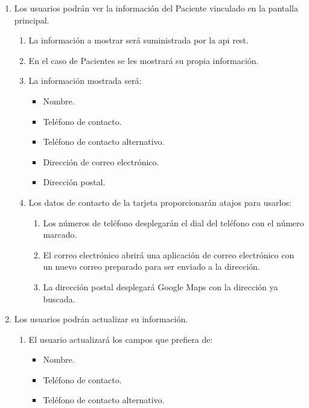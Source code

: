 \begin{enumerate}[label*=RGU \arabic*.]
    \item \label{req:consultar_info_paciente} Los usuarios podrán ver la información del Paciente vinculado en la pantalla principal.
    \begin{enumerate}[label*=\arabic*.]
        \item La información a mostrar será suministrada por la \acrshort{api} \acrshort{rest}.
        \item En el caso de Pacientes se les mostrará su propia información.
        \item La información mostrada será:
        \begin{itemize}
            \item Nombre.
            \item Teléfono de contacto.
            \item Teléfono de contacto alternativo.
            \item Dirección de correo electrónico.
            \item Dirección postal.
        \end{itemize}
        \item \label{req:accion_contactos} Los datos de contacto de la tarjeta proporcionarán atajos para usarlos:
        \begin{enumerate}[label*=\arabic*.]
            \item Los números de teléfono desplegarán el dial del teléfono con el número marcado.
            \item El correo electrónico abrirá una aplicación de correo electrónico con un nuevo correo preparado para ser enviado a la dirección.
            \item La dirección postal desplegará Google Maps con la dirección ya buscada.
        \end{enumerate}
    \end{enumerate}
    \item Los usuarios podrán actualizar su información.
    \begin{enumerate}[label*=\arabic*.]
        \item El usuario actualizará los campos que prefiera de:
        \begin{itemize}
            \item Nombre.
            \item Teléfono de contacto.
            \item Teléfono de contacto alternativo.

\end{itemize}
\end{enumerate}
\end{enumerate}
